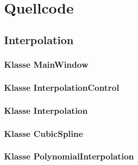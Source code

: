 \chapter{Quellcode}
\label{ch:6}

\section{Interpolation}
\label{sec:6.1}

\subsection{Klasse MainWindow}
\label{ssec:6.1.1}




\subsection{Klasse InterpolationControl}
\label{ssec:6.1.2}




\subsection{Klasse Interpolation}
\label{ssec:6.1.3}




\subsection{Klasse CubicSpline}
\label{ssec:6.1.4}




\subsection{Klasse PolynomialInterpolation}
\label{ssec:6.1.5}

